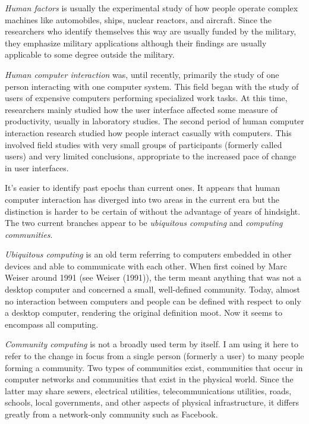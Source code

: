 \emph{Human factors} is usually the experimental study of how people
operate complex machines like automobiles, ships, nuclear reactors, and
aircraft. Since the researchers who identify themselves this way are
usually funded by the military, they emphasize military applications
although their findings are usually applicable to some degree outside
the military.

\emph{Human computer interaction} was, until recently, primarily the
study of one person interacting with one computer system. This field
began with the study of users of expensive computers performing
specialized work tasks. At this time, researchers mainly studied how the
user interface affected some measure of productivity, usually in
laboratory studies. The second period of human computer interaction
research studied how people interact casually with computers. This
involved field studies with very small groups of participants (formerly
called users) and very limited conclusions, appropriate to the increased
pace of change in user interfaces.

It's easier to identify past epochs than current ones. It appears that
human computer interaction has diverged into two areas in the current
era but the distinction is harder to be certain of without the advantage
of years of hindsight. The two current branches appear to be
\emph{ubiquitous computing} and \emph{computing communities}.

\emph{Ubiquitous computing} is an old term referring to computers
embedded in other devices and able to communicate with each other. When
first coined by Marc Weiser around 1991 (see Weiser (1991)), the term
meant anything that was not a desktop computer and concerned a small,
well-defined community. Today, almost no interaction between computers
and people can be defined with respect to only a desktop computer,
rendering the original definition moot. Now it seems to encompass all
computing.

\emph{Community computing} is not a broadly used term by itself. I am
using it here to refer to the change in focus from a single person
(formerly a user) to many people forming a community. Two types of
communities exist, communities that occur in computer networks and
communities that exist in the physical world. Since the latter may share
sewers, electrical utilities, telecommunications utilities, roads,
schools, local governments, and other aspects of physical
infrastructure, it differs greatly from a network-only community such as
Facebook.

